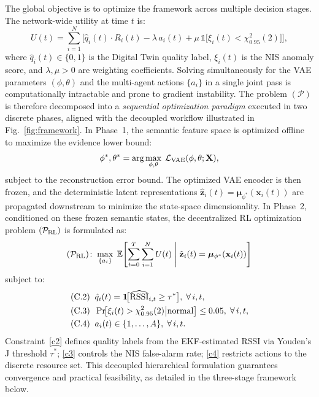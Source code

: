 \documentclass[conference]{IEEEtran}
\begin{document}
The global objective is to optimize the framework across multiple decision
stages. The network-wide utility at time $t$ is:
\begin{equation}
U(t) = \sum_{i=1}^{N}\bigl[
  \hat{q}_i(t)\cdot R_i(t) - \lambda\, a_i(t)
  + \mu\,\mathbb{1}\!\bigl[\xi_i(t) < \chi^2_{0.95}(2)\bigr]
\bigr],
\label{eq:utility}
\end{equation}
where $\hat{q}_i(t)\in\{0,1\}$ is the Digital Twin quality label,
$\xi_i(t)$ is the NIS anomaly score, and $\lambda,\mu>0$ are weighting
coefficients. Solving simultaneously for the VAE parameters $(\phi,\theta)$
and the multi-agent actions $\{a_i\}$ in a single joint pass is
computationally intractable and prone to gradient instability. The
problem $(\mathcal{P})$ is therefore decomposed into a
\textit{sequential optimization paradigm} executed in two discrete phases,
aligned with the decoupled workflow illustrated in Fig.~\ref{fig:framework}.
In Phase~1, the semantic feature space is optimized offline to maximize
the evidence lower bound:
\begin{equation}
\phi^*, \theta^* = \arg\max_{\phi,\theta}\;\mathcal{L}_{\rm VAE}(\phi,\theta;\mathbf{X}),
\label{eq:vae_opt}
\end{equation}
subject to the reconstruction error bound. The optimized VAE encoder is
then frozen, and the deterministic latent representations
$\hat{\mathbf{z}}_i(t)=\bm{\mu}_{\phi^*}(\mathbf{x}_i(t))$ are propagated
downstream to minimize the state-space dimensionality. In Phase~2,
conditioned on these frozen semantic states, the decentralized RL
optimization problem $(\mathcal{P}_{\rm RL})$ is formulated as:
\begin{equation}
(\mathcal{P}_{\rm RL})\!:\;\max_{\{a_i\}}\; \mathbb{E}\!\left[\sum_{t=0}^{T}\sum_{i=1}^{N} U(t) \;\Bigg|\; \hat{\mathbf{z}}_i(t)=\bm{\mu}_{\phi^*}(\mathbf{x}_i(t))\right]
\label{eq:rl_opt}
\end{equation}
subject to:
\begin{align}
&\text{(C.2)}\;\; \hat{q}_i(t) = \mathbf{1}\!\bigl[\widehat{\rm RSSI}_{i,t}\geq\tau^*\bigr], \;\forall\, i,t,\label{c2}\\
&\text{(C.3)}\;\; \Pr\!\bigl[\xi_i(t)>\chi^2_{0.95}(2)\big|\text{normal}\bigr] \leq 0.05,\;\forall\, i,t,\label{c3}\\
&\text{(C.4)}\;\; a_i(t)\in\{1,\ldots,A\},\;\forall\, i,t.\label{c4}
\end{align}
Constraint~\eqref{c2} defines quality labels from the EKF-estimated RSSI
via Youden's J threshold $\tau^*$; \eqref{c3} controls the NIS false-alarm
rate; \eqref{c4} restricts actions to the discrete resource set. This
decoupled hierarchical formulation guarantees convergence and practical
feasibility, as detailed in the three-stage framework below.
\end{document}
